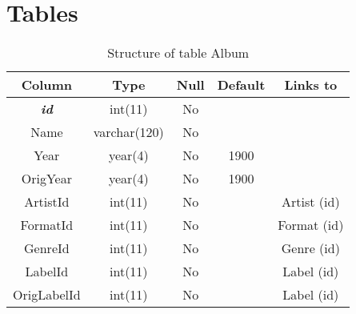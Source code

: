 \chapter*{Tables}
{}
\renewcommand\thetable{1.\arabic{table}}
\setcounter{table}{0}

%
%
\begin{longtable}{|c|c|c|c|c|} 
\caption{Structure of table Album} 
\label{tab:Album-structure} \\
\hline 
\multicolumn{1}{|c|}{\textbf{Column}} & \multicolumn{1}{|c|}{\textbf{Type}} & \multicolumn{1}{|c|}{\textbf{Null}} & \multicolumn{1}{|c|}{\textbf{Default}} & \multicolumn{1}{|c|}{\textbf{Links to}} \\
\hline
\textbf{\textit{id}} & int(11) & No &  &  \\ 
\hline 
Name & varchar(120) & No &  &  \\ 
\hline 
Year & year(4) & No &  1900 &  \\ 
\hline 
OrigYear & year(4) & No & 1900 &  \\ 
\hline 
ArtistId & int(11) & No &  & Artist (id) \\ 
\hline 
FormatId & int(11) & No &  & Format (id) \\ 
\hline 
GenreId & int(11) & No &  & Genre (id) \\ 
\hline 
LabelId & int(11) & No &  & Label (id) \\ 
\hline 
OrigLabelId & int(11) & No &  & Label (id) \\ 
\hline 
\end{longtable}

%
%

